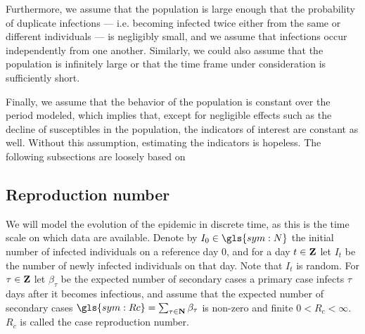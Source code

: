 Furthermore, we assume that the population is large enough that the probability of duplicate infections --- i.e. becoming infected twice either from the same or different individuals --- is negligibly small, and we assume that infections occur independently from one another. Similarly, we could also assume that the population is infinitely large or that the time frame under consideration is sufficiently short.

Finally, we assume that the behavior of the population is constant over the period modeled, which implies that, except for negligible effects such as the decline of susceptibles in the population, the indicators of interest are constant as well. Without this assumption, estimating the indicators is hopeless.
The following subsections are loosely based on \citep{Diekmann2013Mathematical,Hotz2020Monitoring}


\subsection{Reproduction number}
\label{subsec:reproduction_number}
We will model the evolution of the epidemic in discrete time, as this is the time scale on which data are available. Denote by $I_{0} \in \gls{sym:N}$ the initial number of infected individuals on a reference day $0$, and for a day $t \in \mathbf Z$ let $I_{t}$ be the number of newly infected individuals on that day. Note that $I_{t}$ is random. For $\tau\in\mathbf Z$ let $\beta_{\tau}$ be the expected number of secondary cases a primary case infects $\tau$ days after it becomes infectious, and assume that the expected number of secondary cases $
\gls{sym:Rc} = \sum_{\tau \in \N}\beta_{\tau}$ is non-zero and finite $0 < R_{c} < \infty$. $R_{c}$ is called the case reproduction number.  

